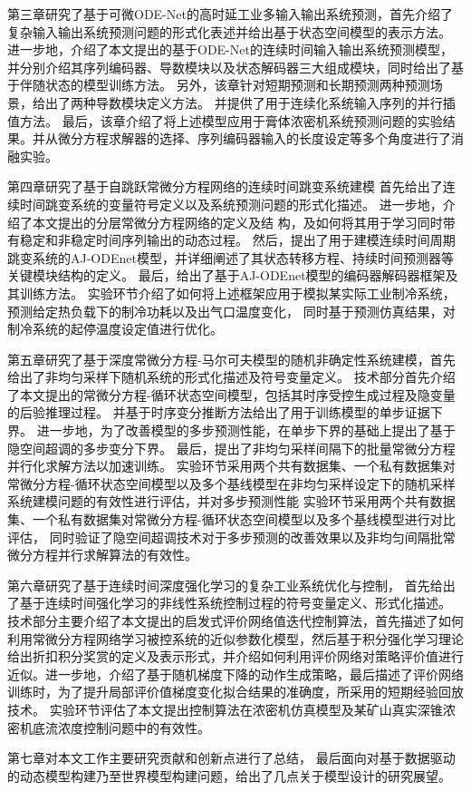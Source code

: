 
第三章研究了基于可微ODE-Net的高时延工业多输入输出系统预测，首先介绍了复杂输入输出系统预测问题的形式化表述并给出基于状态空间模型的表示方法。
进一步地，介绍了本文提出的基于ODE-Net的连续时间输入输出系统预测模型，并分别介绍其序列编码器、导数模块以及状态解码器三大组成模块，同时给出了基于伴随状态的模型训练方法。
另外，该章针对短期预测和长期预测两种预测场景，给出了两种导数模块定义方法。
并提供了用于连续化系统输入序列的并行插值方法。
最后，该章介绍了将上述模型应用于膏体浓密机系统预测问题的实验结果。并从微分方程求解器的选择、序列编码器输入的长度设定等多个角度进行了消融实验。

第四章研究了基于自跳跃常微分方程网络的连续时间跳变系统建模
首先给出了连续时间跳变系统的变量符号定义以及系统预测问题的形式化描述。
进一步地，介绍了本文提出的分层常微分方程网络的定义及结
构，及如何将其用于学习同时带有稳定和非稳定时间序列输出的动态过程。
然后，提出了用于建模连续时间周期跳变系统的AJ-ODEnet模型，并详细阐述了其状态转移方程、持续时间预测器等关键模块结构的定义。
最后，给出了基于AJ-ODEnet模型的编码器解码器框架及其训练方法。
实验环节介绍了如何将上述框架应用于模拟某实际工业制冷系统，预测给定热负载下的制冷功耗以及出气口温度变化，
同时基于预测仿真结果，对制冷系统的起停温度设定值进行优化。

第五章研究了基于深度常微分方程-马尔可夫模型的随机非确定性系统建模，首先给出了非均匀采样下随机系统的形式化描述及符号变量定义。
技术部分首先介绍了本文提出的常微分方程-循环状态空间模型，包括其时序受控生成过程及隐变量的后验推理过程。
并基于时序变分推断方法给出了用于训练模型的单步证据下界。
进一步地，为了改善模型的多步预测性能，在单步下界的基础上提出了基于隐空间超调的多步变分下界。
最后，提出了非均匀采样间隔下的批量常微分方程并行化求解方法以加速训练。
实验环节采用两个共有数据集、一个私有数据集对常微分方程-循环状态空间模型以及多个基线模型在非均匀采样设定下的随机采样系统建模问题的有效性进行评估，并对多步预测性能
实验环节采用两个共有数据集、一个私有数据集对常微分方程-循环状态空间模型以及多个基线模型进行对比评估，
同时验证了隐空间超调技术对于多步预测的改善效果以及非均匀间隔批常微分方程并行求解算法的有效性。


第六章研究了基于连续时间深度强化学习的复杂工业系统优化与控制，
首先给出了基于连续时间强化学习的非线性系统控制过程的符号变量定义、形式化描述。
技术部分主要介绍了本文提出的启发式评价网络值迭代控制算法，首先描述了如何利用常微分方程网络学习被控系统的近似参数化模型，然后基于积分强化学习理论给出折扣积分奖赏的定义及表示形式，并介绍如何利用评价网络对策略评价值进行近似。进一步地，介绍了基于随机梯度下降的动作生成策略，最后描述了评价网络训练时，为了提升局部评价值梯度变化拟合结果的准确度，所采用的短期经验回放技术。
实验环节评估了本文提出控制算法在浓密机仿真模型及某矿山真实深锥浓密机底流浓度控制问题中的有效性。


第七章对本文工作主要研究贡献和创新点进行了总结，
最后面向对基于数据驱动的动态模型构建乃至世界模型构建问题，给出了几点关于模型设计的研究展望。
